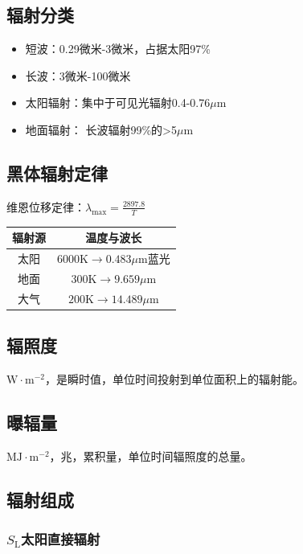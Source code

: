 \documentclass[UTF8,11pt]{ctexbook}
\begin{document}
\subsection{辐射分类}
\begin{itemize}
    \item 短波：0.29微米-3微米，占据太阳97\%
    \item 长波：3微米-100微米
    \item 太阳辐射：集中于可见光辐射0.4-0.76\(\mu\)m
    \item 地面辐射： 长波辐射99\%的>5\(\mu\)m
\end{itemize}

\subsection{黑体辐射定律}

维恩位移定律：\(\lambda_\mathrm{max}=\frac{2897.8}{T}\)
\begin{table}[htbp]
    \centering
    \begin{tabular}{cc}
        \toprule
        辐射源 & 温度与波长\\
        \midrule
        太阳 & \(6000\mathrm{K}\rightarrow0.483\mu\mathrm{m}\)蓝光\\
        地面 & \(300\mathrm{K}\rightarrow9.659\mu\mathrm{m}\)\\
        大气 & \(200\mathrm{K}\rightarrow14.489\mu\mathrm{m}\)\\
        \bottomrule
    \end{tabular}
\end{table}

\subsection{辐照度}

\(\mathrm{W\cdot m^{-2}}\)，是瞬时值，单位时间投射到单位面积上的辐射能。

\subsection{曝辐量}

\(\mathrm{MJ\cdot m^{-2}}\)，兆，累积量，单位时间辐照度的总量。

\subsection{辐射组成}

\subsubsection{\(S_\mathrm{L}\)太阳直接辐射}
\end{document}
